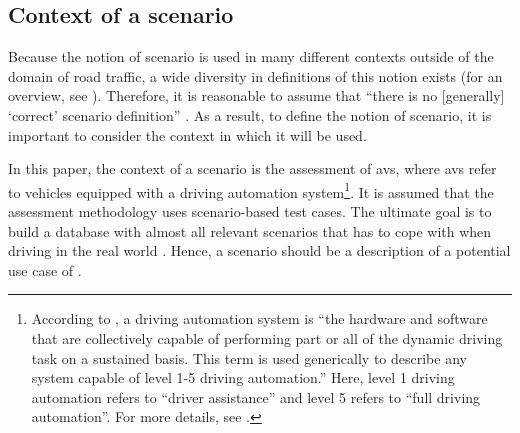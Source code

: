 \subsection{Context of a scenario}
\label{sec:context}

Because the notion of scenario is used in many different contexts \cstartd outside of the domain of road traffic\cendd, a wide diversity in definitions of this notion exists (for an overview, see \autocite{vannotten2003updated, bishop2007scentechniques}). Therefore, it is reasonable to assume that ``there is no [generally] `correct' scenario definition'' \autocite{vannotten2003updated}. As a result, to define the notion of scenario, it is important to consider the context in which it will be used. 

In this paper, the context of a scenario is the assessment of \acp{av}, where \acp{av} refer to vehicles equipped with a driving automation system\footnote{According to \autocite{sae2018j3016}, a driving automation system is ``the hardware and software that are collectively capable of performing part or all of the dynamic driving task on a sustained basis. This term is used generically to describe any system capable of level 1-5 driving automation.'' Here, level 1 driving automation refers to ``driver assistance'' and level 5 refers to ``full driving automation''. For more details, see \autocite{sae2018j3016}.}. 
It is assumed that the assessment methodology uses scenario-based test cases. %
The ultimate goal is to build a database with \cstartf almost \cendf all relevant scenarios that  has to cope with when driving in the real world \autocite{putz2017pegasus}. Hence, a scenario should be a description of a potential use case of . 




